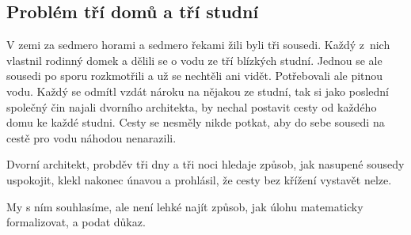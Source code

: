 \subsection{Problém tří domů a tří studní}
\label{ssec:problem-tri-domu-a-tri-studni}

V zemi za sedmero horami a sedmero řekami žili byli tři sousedi. Každý z~nich
vlastnil rodinný domek a dělili se o vodu ze tří blízkých studní. Jednou se
ale sousedi po sporu rozkmotřili a už se nechtěli ani vidět. Potřebovali ale
pitnou vodu. Každý se odmítl vzdát nároku na nějakou ze studní, tak si jako
poslední společný čin najali dvorního architekta, by nechal postavit cesty od
každého domu ke každé studni. Cesty se nesměly nikde potkat, aby do sebe
sousedi na cestě pro vodu náhodou nenarazili.

Dvorní architekt, probděv tři dny a tři noci hledaje způsob, jak nasupené
sousedy uspokojit, klekl nakonec únavou a prohlásil, že cesty bez křížení
vystavět nelze.

My s ním souhlasíme, ale není lehké najít způsob, jak úlohu matematicky
formalizovat, a podat důkaz.

